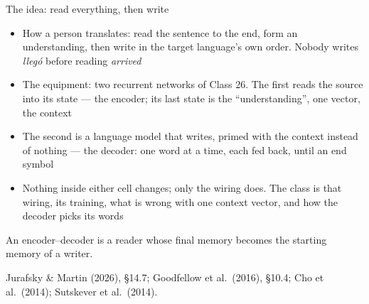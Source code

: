 \documentclass[aspectratio=169, 11pt]{beamer}
\newcommand{\srcline}[1]{%
  \par\vspace{0.25em}%
  {\scriptsize\color{mcMuted}\hfill #1\par}}
\begin{document}
\begin{frame}{The idea: read everything, then write}
  \vspace{0.05em}
  {\footnotesize
  \begin{itemize}\itemsep0.28em
    \item How a person translates: read the sentence \alert{to the end},
          form an understanding, then write in the target language's own
          order. Nobody writes \emph{lleg\'o} before reading \emph{arrived}
    \item The equipment: \alert{two} recurrent networks of Class 26. The
          first \alert{reads} the source into its state --- the
          \alert{encoder}; its last state is the ``understanding'', one
          vector, the \alert{context}
    \item The second is a language model that \alert{writes}, primed with
          the context instead of nothing --- the \alert{decoder}: one word
          at a time, each fed back, until an end symbol
    \item Nothing inside either cell changes; only the wiring does. The
          class is that wiring, its training, what is wrong with one
          context vector, and how the decoder picks its words
  \end{itemize}}
  \vspace{0.1em}
  \begin{redhighlight}
    An encoder--decoder is a reader whose final memory becomes the
    starting memory of a writer.
  \end{redhighlight}
  \srcline{Jurafsky \& Martin (2026), \S14.7; Goodfellow et al.\ (2016), \S10.4; Cho et al.\ (2014); Sutskever et al.\ (2014).}
\end{frame}
\end{document}
